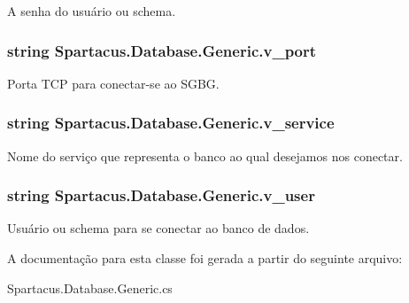 A senha do usuário ou schema. 

\hypertarget{classSpartacus_1_1Database_1_1Generic_a5df6e2c77be89b3e34903ca4fc0068d0}{
\subsubsection[{v\+\_\+port}]{\setlength{\rightskip}{0pt plus 5cm}string Spartacus.\+Database.\+Generic.\+v\+\_\+port}}\label{classSpartacus_1_1Database_1_1Generic_a5df6e2c77be89b3e34903ca4fc0068d0}


Porta T\+C\+P para conectar-\/se ao S\+G\+B\+G. 

\hypertarget{classSpartacus_1_1Database_1_1Generic_a3b7fd3196d76de6475c4a18edbfeea8f}{
\subsubsection[{v\+\_\+service}]{\setlength{\rightskip}{0pt plus 5cm}string Spartacus.\+Database.\+Generic.\+v\+\_\+service}}\label{classSpartacus_1_1Database_1_1Generic_a3b7fd3196d76de6475c4a18edbfeea8f}


Nome do serviço que representa o banco ao qual desejamos nos conectar. 

\hypertarget{classSpartacus_1_1Database_1_1Generic_a945755698e1b479f3e581ea918338ef5}{
\subsubsection[{v\+\_\+user}]{\setlength{\rightskip}{0pt plus 5cm}string Spartacus.\+Database.\+Generic.\+v\+\_\+user}}\label{classSpartacus_1_1Database_1_1Generic_a945755698e1b479f3e581ea918338ef5}


Usuário ou schema para se conectar ao banco de dados. 



A documentação para esta classe foi gerada a partir do seguinte arquivo\+:\begin{DoxyCompactItemize}
\item 
Spartacus.\+Database.\+Generic.\+cs\end{DoxyCompactItemize}

